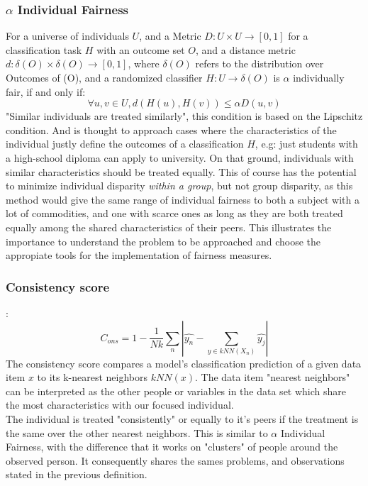 \subsubsection{$\alpha$ Individual Fairness}\cite{DIJ20}
For a universe of individuals $U$, and a Metric $D:U\times U \to [0,1]$ for a classification task $H$ with an outcome set $O$, and a distance metric $d:\delta (O)\times \delta(O) \to [0,1]$, where $\delta(O)$ refers to the distribution over Outcomes of (O), and a randomized classifier $H:U\to \delta(O)$ is $\alpha$ individually fair, if and only if:
 \[\forall u,v \in U, d(H(u), H(v)) \leq\alpha D(u,v)  \]
"Similar individuals are treated similarly", this condition is based on the Lipschitz condition. And is thought to approach cases where the characteristics of the individual justly define the outcomes of a classification $H$, e.g: just students with a high-school diploma can apply to university. On that ground, individuals with similar characteristics should be treated equally. This of course has the potential to minimize individual disparity \textsl{within a group}, but not group disparity, as this method would give the same range of individual fairness to both a subject with a lot of commodities, and one with scarce ones as long as they are both treated equally among the shared characteristics of their peers. This illustrates the importance to understand the problem to be approached and choose the appropiate tools for the implementation of fairness measures.

\subsubsection{Consistency score}:
\[ C_{ons} = 1-\frac{1}{Nk}\sum_{n}{|\hat{y_n} - \sum_{y \in {kNN(X_n)}}{\hat{y_j}}|}  \]
The consistency score compares a model’s classification prediction of a given data item $x$ to its k-nearest neighbors $ kNN(x)$. \cite{RYK*13}The data item "nearest neighbors" can be interpreted as the other people or variables in the data set which share the most characteristics with our focused individual. \\
The individual is treated "consistently" or equally to it's peers if the treatment is the same over the other nearest neighbors. This is similar to $\alpha$ Individual Fairness, with the difference that it works on "clusters" of people around the observed person. It consequently shares the sames problems, and observations stated in the previous definition.


